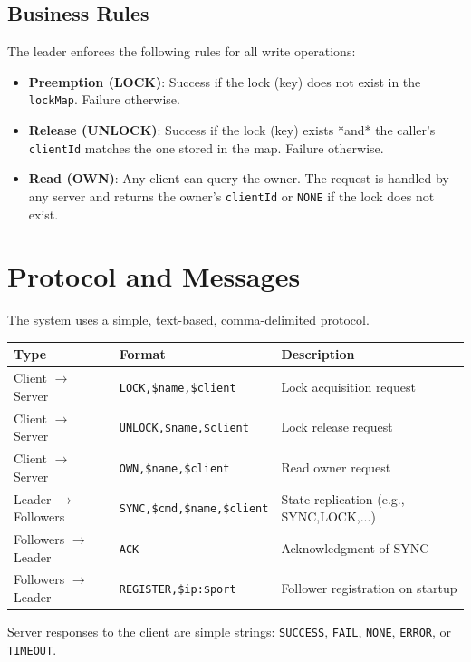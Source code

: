 \documentclass[a4paper,11pt]{article}
\begin{document}
\subsection*{Business Rules}
The leader enforces the following rules for all write operations:
\begin{itemize}
    \item \textbf{Preemption (LOCK)}: Success if the lock (key) does not exist in the \texttt{lockMap}. Failure otherwise.
    \item \textbf{Release (UNLOCK)}: Success if the lock (key) exists *and* the caller's \texttt{clientId} matches the one stored in the map. Failure otherwise.
    \item \textbf{Read (OWN)}: Any client can query the owner. The request is handled by any server and returns the owner's \texttt{clientId} or \texttt{NONE} if the lock does not exist.
\end{itemize}

\section{Protocol and Messages}
The system uses a simple, text-based, comma-delimited protocol.

\begin{center}
\begin{tabular}{|l|l|l|}
\hline
\textbf{Type} & \textbf{Format} & \textbf{Description}\\\hline
Client $\rightarrow$ Server & \texttt{LOCK,\$name,\$client} & Lock acquisition request\\\hline
Client $\rightarrow$ Server & \texttt{UNLOCK,\$name,\$client} & Lock release request\\\hline
Client $\rightarrow$ Server & \texttt{OWN,\$name,\$client} & Read owner request\\\hline
Leader $\rightarrow$ Followers & \texttt{SYNC,\$cmd,\$name,\$client} & State replication (e.g., SYNC,LOCK,...) \\\hline
Followers $\rightarrow$ Leader & \texttt{ACK} & Acknowledgment of SYNC\\\hline
Followers $\rightarrow$ Leader & \texttt{REGISTER,\$ip:\$port} & Follower registration on startup\\\hline
\end{tabular}
\end{center}

Server responses to the client are simple strings: \texttt{SUCCESS}, \texttt{FAIL}, \texttt{NONE}, \texttt{ERROR}, or \texttt{TIMEOUT}.
\end{document}
